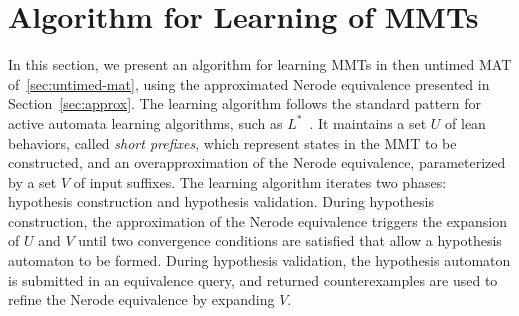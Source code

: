 \section{Algorithm for Learning of MMTs}
\label{sec:learning}

In this section, we present an algorithm for learning MMTs in then untimed
MAT of~\ref{sec:untimed-mat}, using the approximated Nerode equivalence
presented in Section~\ref{sec:approx}.
The learning algorithm follows the standard pattern for active automata learning
algorithms, such as $L^*$~\cite{Ang87}. It maintains
a set $U$ of lean behaviors, called {\em short prefixes}, which
represent states in the MMT to be constructed,
and an overapproximation of the Nerode equivalence,
parameterized by a set $V$ of input suffixes.
The learning algorithm iterates two phases: hypothesis construction and
hypothesis validation.
During hypothesis construction,
the approximation of the Nerode equivalence triggers the expansion of
$U$ and $V$ until two convergence conditions are satisfied that allow
a hypothesis automaton to be formed.
During hypothesis validation, the hypothesis automaton is submitted in an
equivalence query, and returned counterexamples are used to refine
the Nerode equivalence by expanding $V$.


